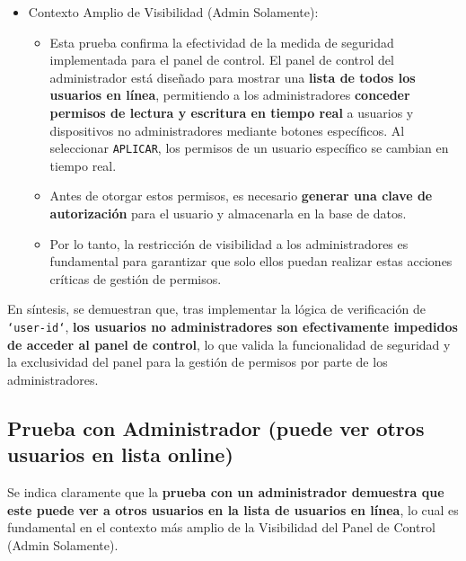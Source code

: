 \documentclass{report}
\begin{document}
\begin{itemize}
    \item Contexto Amplio de Visibilidad (Admin Solamente):
    \begin{itemize}
        \item Esta prueba confirma la efectividad de la medida de seguridad implementada para el panel de control. El panel de control del administrador 
              está diseñado para mostrar una \textbf{lista de todos los usuarios en línea}, permitiendo a los administradores \textbf{conceder permisos 
              de lectura y escritura en tiempo real} a usuarios y dispositivos no administradores mediante botones específicos. Al seleccionar 
              \texttt{APLICAR}, los permisos de un usuario específico se cambian en tiempo real.
        \item Antes de otorgar estos permisos, es necesario \textbf{generar una clave de autorización} para el usuario y almacenarla en la base de datos.
        \item Por lo tanto, la restricción de visibilidad a los administradores es fundamental para garantizar que solo ellos puedan realizar estas 
              acciones críticas de gestión de permisos.
    \end{itemize}
\end{itemize}

En síntesis, se  demuestran que, tras implementar la lógica de verificación de \texttt{`user-id`}, \textbf{los usuarios no administradores son 
efectivamente impedidos de acceder al panel de control}, lo que valida la funcionalidad de seguridad y la exclusividad del panel para la gestión de 
permisos por parte de los administradores.

\subsection{Prueba con Administrador (puede ver otros usuarios en lista online)}
Se indica claramente que la \textbf{prueba con un administrador demuestra que este puede ver a otros usuarios en la lista de usuarios en línea}, 
lo cual es fundamental en el contexto más amplio de la Visibilidad del Panel de Control (Admin Solamente).
\end{document}
